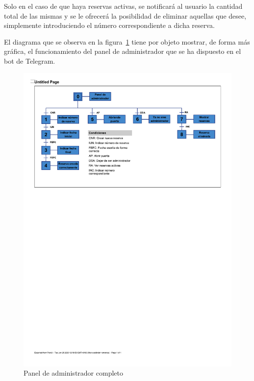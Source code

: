 Solo en el caso de que haya reservas activas, se notificará al usuario la cantidad total de las mismas y se le ofrecerá la posibilidad de eliminar aquellas que desee, simplemente introduciendo el número correspondiente a dicha reserva.

El diagrama que se observa en la figura~\ref{fig:panel-administrador-completo} tiene por objeto mostrar, de forma más gráfica, el funcionamiento del panel de administrador que se ha dispuesto en el bot de Telegram.

\begin{figure}[tbp]
\centering
\includegraphics[scale=0.8]{fig/Panel_administrador_completo.pdf}
\caption{Panel de administrador completo}
\label{fig:panel-administrador-completo}
\end{figure}

